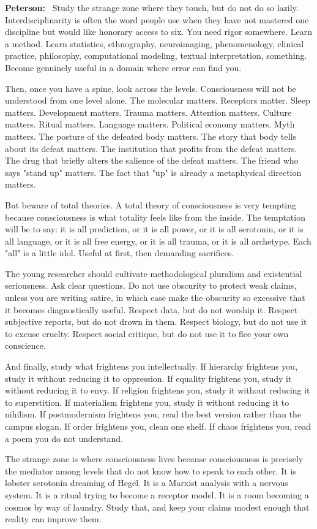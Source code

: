 \documentclass[a4paper,11pt]{article}
\newenvironment{answer}{\par\noindent\color{black}\textbf{Peterson:}\ }{\par}
\begin{document}
\begin{answer}
Study the strange zone where they touch, but do not do so lazily. Interdisciplinarity is often the word people use when they have not mastered one discipline but would like honorary access to six. You need rigor somewhere. Learn a method. Learn statistics, ethnography, neuroimaging, phenomenology, clinical practice, philosophy, computational modeling, textual interpretation, something. Become genuinely useful in a domain where error can find you.

Then, once you have a spine, look across the levels. Consciousness will not be understood from one level alone. The molecular matters. Receptors matter. Sleep matters. Development matters. Trauma matters. Attention matters. Culture matters. Ritual matters. Language matters. Political economy matters. Myth matters. The posture of the defeated body matters. The story that body tells about its defeat matters. The institution that profits from the defeat matters. The drug that briefly alters the salience of the defeat matters. The friend who says "stand up" matters. The fact that "up" is already a metaphysical direction matters.

But beware of total theories. A total theory of consciousness is very tempting because consciousness is what totality feels like from the inside. The temptation will be to say: it is all prediction, or it is all power, or it is all serotonin, or it is all language, or it is all free energy, or it is all trauma, or it is all archetype. Each "all" is a little idol. Useful at first, then demanding sacrifices.

The young researcher should cultivate methodological pluralism and existential seriousness. Ask clear questions. Do not use obscurity to protect weak claims, unless you are writing satire, in which case make the obscurity so excessive that it becomes diagnostically useful. Respect data, but do not worship it. Respect subjective reports, but do not drown in them. Respect biology, but do not use it to excuse cruelty. Respect social critique, but do not use it to flee your own conscience.

And finally, study what frightens you intellectually. If hierarchy frightens you, study it without reducing it to oppression. If equality frightens you, study it without reducing it to envy. If religion frightens you, study it without reducing it to superstition. If materialism frightens you, study it without reducing it to nihilism. If postmodernism frightens you, read the best version rather than the campus slogan. If order frightens you, clean one shelf. If chaos frightens you, read a poem you do not understand.

The strange zone is where consciousness lives because consciousness is precisely the mediator among levels that do not know how to speak to each other. It is lobster serotonin dreaming of Hegel. It is a Marxist analysis with a nervous system. It is a ritual trying to become a receptor model. It is a room becoming a cosmos by way of laundry. Study that, and keep your claims modest enough that reality can improve them.
\end{answer}
\end{document}

